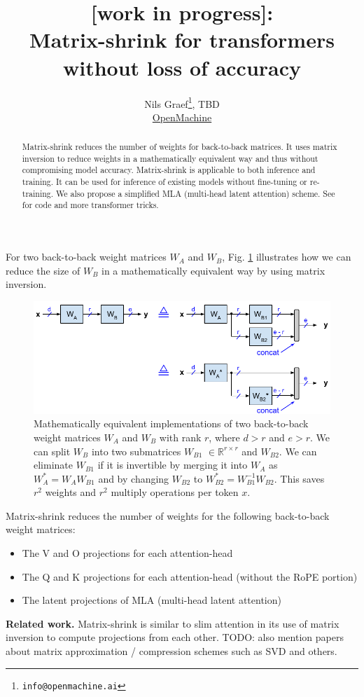 \documentclass{article}
\title{[work in progress]: \\ Matrix-shrink for transformers without loss of accuracy}
\author{Nils Graef\thanks{\texttt{info@openmachine.ai}}, TBD \\
  \href{https://openmachine.ai}{OpenMachine}}
\newcommand{\eR}[2]{$\in \mathbb{R}^{#1 \times #2}$}  %
\begin{document}
 \maketitle

\begin{abstract}
Matrix-shrink reduces the number of weights for back-to-back matrices. It uses matrix inversion to reduce weights in a mathematically equivalent way and thus without compromising model accuracy. Matrix-shrink is applicable to both inference and training. It can be used for inference of existing models without fine-tuning or re-training. We also propose a simplified MLA (multi-head latent attention) scheme. See \citep{tricks} for code and more transformer tricks.
\end{abstract}

For two back-to-back weight matrices $W_A$ and $W_B$, Fig. \ref{fig1} illustrates how we can reduce the size of $W_B$ in a mathematically equivalent way by using matrix inversion.
\begin{figure}[h!] \centering  %
  \includegraphics[scale=0.88]{../doc/fig/matShrink_fig1.pdf}
  \caption{Mathematically equivalent implementations of two back-to-back weight matrices $W_A$ and $W_B$ with rank $r$, where $d > r$ and $e > r$. We can split $W_B$ into two submatrices $W_{B1}$ \eR{r}{r} and $W_{B2}$. We can eliminate $W_{B1}$ if it is invertible by merging it into $W_A$ as $W_A^\ast = W_A W_{B1}$ and by changing $W_{B2}$ to $W_{B2}^\ast = W_{B1}^{-1} W_{B2}$. This saves $r^2$ weights and $r^2$ multiply operations per token $x$.}
\label{fig1} \end{figure}

Matrix-shrink reduces the number of weights for the following back-to-back weight matrices:

\begin{itemize}[topsep=-1pt, itemsep=-1pt]
  \item The V and O projections for each attention-head
  \item The Q and K projections for each attention-head (without the RoPE portion)
  \item The latent projections of MLA (multi-head latent attention)
\end{itemize}
\textbf{Related work.} Matrix-shrink is similar to slim attention \citep{slimAttn} in its use of matrix inversion to compute projections from each other. TODO: also mention papers about matrix approximation / compression schemes such as SVD and others.
\end{document}
